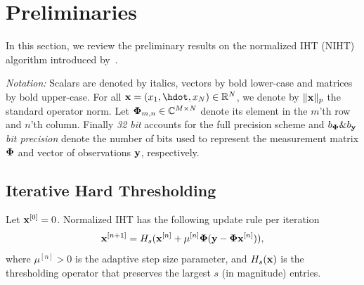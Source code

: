 \documentclass{article}
\begin{document}
\section{Preliminaries}\label{section_iht}
\vspace{-0.5em}

In this section, we review the preliminary results on the normalized IHT (NIHT) algorithm introduced by~\cite{blumensath2010niht, blumensath2012greedy}.
\vspace{-0.3em}

{\it Notation:} Scalars are denoted by italics, vectors by bold lower-case and matrices by bold upper-case. For all ${\bf x}= (x_1, \hdot, x_N) \in \mathbb{R}^N$, we denote by $\|{\bf x}\|_p$ the standard operator norm. Let ${\bf \Phi}_{m, n}\in \mathbb{C}^{M\times N}$ denote its element in the $m$'th row and $n$'th column. Finally {\it 32 bit} accounts for the full precision scheme and $b_{\bf \Phi}\&b_{\bf y}${\it bit precision} denote the number of bits used to represent the measurement matrix ${\bf \Phi}$ and vector of observations ${\bf y}$, respectively.
\vspace{-1em}
\subsection{Iterative Hard Thresholding} 
\vspace{-0.5em}
Let ${\bf x}^{[0]} = 0$. Normalized IHT has the following update rule per iteration
\begin{equation}\label{iht_update_rule}
{\bf x}^{[n+1]} = H_s({\bf x}^{[n]} + \mu^{[n]}{\bf \Phi}({\bf y}-{\bf \Phi}{\bf x}^{[n]})),
\end{equation}
where $\mu^{[n]}>0$ is the adaptive step size parameter, and $H_s({\bf x})$ is the
thresholding operator that preserves the largest $s$ (in magnitude) entries.



\end{document}
